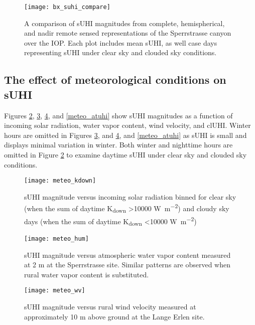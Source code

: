 \begin{figure}[H]
	\centering
	\texttt{[image: bx\_suhi\_compare]}
	\caption{A comparison of sUHI magnitudes from complete, hemispherical, and nadir remote sensed representations of the Sperrstrasse canyon over the IOP. Each plot includes mean sUHI, as well case days representing sUHI under clear sky and clouded sky conditions.}
	\label{bx_suhi_compare}
\end{figure}

\subsection{The effect of meteorological conditions on sUHI}

Figures \ref{meteo_kdown}, \ref{meteo_hum}, \ref{meteo_wv}, and \ref{meteo_atuhi} show sUHI magnitudes as a function of incoming solar radiation, water vapor content, wind velocity, and clUHI. Winter hours are omitted in Figures \ref{meteo_hum}, and \ref{meteo_wv}, and \ref{meteo_atuhi} as sUHI is small and displays minimal variation in winter. Both winter and nighttime hours are omitted in Figure \ref{meteo_kdown} to examine daytime sUHI under clear sky and clouded sky conditions.

\begin{figure}[H]
	\centering
	\texttt{[image: meteo\_kdown]}
	\caption{sUHI magnitude versus incoming solar radiation binned for clear sky (when the sum of daytime K\textsubscript{down} \textgreater 10000 \si{\watt \per \square \meter}) and cloudy sky days (when the sum of daytime K\textsubscript{down} \textless 10000 \si{\watt \per \square \meter})}
	\label{meteo_kdown}
\end{figure}

\begin{figure}[H]
	\centering
	\texttt{[image: meteo\_hum]}
	\caption{sUHI magnitude versus atmospheric water vapor content measured at 2 \si{\meter} at the Sperrstrasse site. Similar patterns are observed when rural water vapor content is substituted.}
	\label{meteo_hum}
\end{figure}

\begin{figure}[H]
	\centering
	\texttt{[image: meteo\_wv]}
	\caption{sUHI magnitude versus rural wind velocity measured at approximately 10 \si{\meter} above ground at the Lange Erlen site.}
	\label{meteo_wv}
\end{figure}

